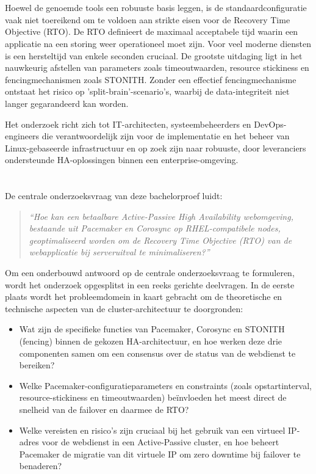\section{}%
\label{sec:probleemstelling}

Hoewel de genoemde tools een robuuste basis leggen, is de standaardconfiguratie vaak niet toereikend om te voldoen aan strikte eisen voor de Recovery Time Objective (RTO). De RTO definieert de maximaal acceptabele tijd waarin een applicatie na een storing weer operationeel moet zijn. Voor veel moderne diensten is een hersteltijd van enkele seconden cruciaal. De grootste uitdaging ligt in het nauwkeurig afstellen van parameters zoals timeoutwaarden, resource stickiness en fencingmechanismen zoals STONITH. Zonder een effectief fencingmechanisme ontstaat het risico op 'split-brain'-scenario's, waarbij de data-integriteit niet langer gegarandeerd kan worden.
\medskip

Het onderzoek richt zich tot IT-architecten, systeembeheerders en DevOps-engineers die verantwoordelijk zijn voor de implementatie en het beheer van Linux-gebaseerde infrastructuur en op zoek zijn naar robuuste, door leveranciers ondersteunde HA-oplossingen binnen een enterprise-omgeving.

\section{}%
\label{sec:onderzoeksvraag}

De centrale onderzoeksvraag van deze bachelorproef luidt:
\begin{quote}
    \textit{“Hoe kan een betaalbare Active-Passive High Availability webomgeving, bestaande uit Pacemaker en Corosync op RHEL-compatibele nodes, geoptimaliseerd worden om de Recovery Time Objective (RTO) van de webapplicatie bij serveruitval te minimaliseren?”}
\end{quote}
\medskip 

Om een onderbouwd antwoord op de centrale onderzoeksvraag te formuleren, wordt het onderzoek opgesplitst in een reeks gerichte deelvragen. In de eerste plaats wordt het probleemdomein in kaart gebracht om de theoretische en technische aspecten van de cluster-architectuur te doorgronden:
\begin{itemize}
    \item Wat zijn de specifieke functies van Pacemaker, Corosync en STONITH (fencing) binnen de gekozen HA-architectuur, en hoe werken deze drie componenten samen om een consensus over de status van de webdienst te bereiken?
    \item Welke Pacemaker-configuratieparameters en constraints (zoals opstartinterval, resource-stickiness en timeoutwaarden) beïnvloeden het meest direct de snelheid van de failover en daarmee de RTO?
    \item Welke vereisten en risico’s zijn cruciaal bij het gebruik van een virtueel IP-adres voor de webdienst in een Active-Passive cluster, en hoe beheert Pacemaker de migratie van dit virtuele IP om zero downtime bij failover te benaderen?
\end{itemize}
\medskip 

